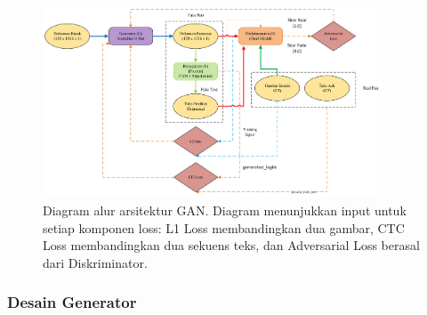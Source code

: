 \documentclass[12pt,a4paper]{article}
\begin{document}
\begin{figure}[htbp!]
\centering
\includegraphics[width=0.9\textwidth]{images/ArsitekturUmum.png}
\caption{Diagram alur arsitektur GAN. Diagram menunjukkan input untuk setiap komponen loss: L1 Loss membandingkan dua gambar, CTC Loss membandingkan dua sekuens teks, dan Adversarial Loss berasal dari Diskriminator.}
\label{fig:arch_overview}
\end{figure}

\subsubsection{Desain Generator} %
\end{document}
